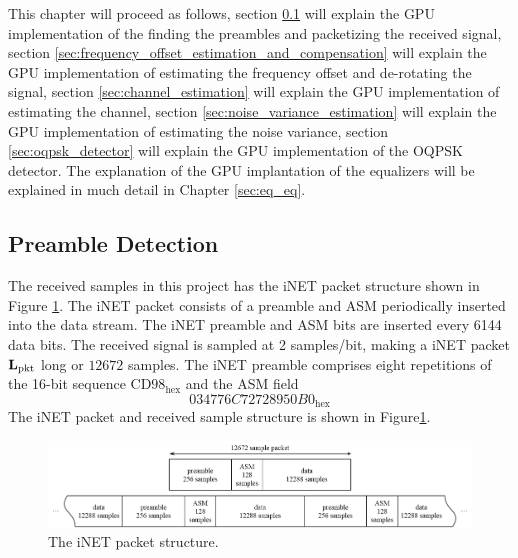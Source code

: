 This chapter will proceed as follows, 
section \ref{sec:preamble_detection} will explain the GPU implementation of the finding the preambles and packetizing the received signal,
section \ref{sec:frequency_offset_estimation_and_compensation} will explain the GPU implementation of estimating the frequency offset and de-rotating the signal,
section \ref{sec:channel_estimation} will explain the GPU implementation of estimating the channel,
section \ref{sec:noise_variance_estimation} will explain the GPU implementation of estimating the noise variance,
section \ref{sec:oqpsk_detector} will explain the GPU implementation of the OQPSK detector.
The explanation of the GPU implantation of the equalizers will be explained in much detail in Chapter \ref{sec:eq_eq}.





















\subsection{Preamble Detection}
\label{sec:preamble_detection}
The received samples in this project has the iNET packet structure shown in Figure \ref{fig:packet}.
The iNET packet consists of a preamble and ASM periodically inserted into the data stream.
The iNET preamble and ASM bits are inserted every 6144 data bits.
The received signal is sampled at 2 samples/bit, making a iNET packet $\mathbf{L}_\text{pkt}$ long or $12672$ samples.
The iNET preamble comprises eight repetitions of the 16-bit sequence $\text{CD98}_\text{hex}$ and the ASM field
\begin{equation}
034776C72728950B0_\text{hex}
\end{equation}
The iNET packet and received sample structure is shown in Figure\ref{fig:packet}.
\begin{figure}
	\centering\includegraphics[width=\textwidth/10*11]{figures/gpu/packet.png}
	\caption{The iNET packet structure.}
	\label{fig:packet}
\end{figure}

